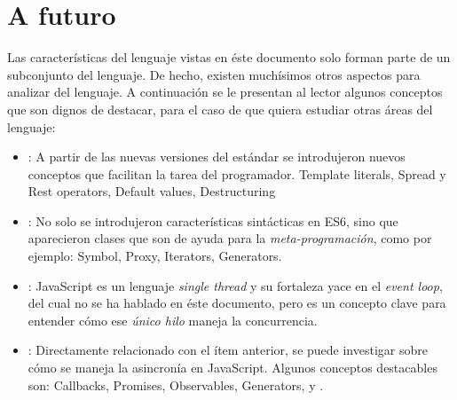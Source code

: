 \section{A futuro}

Las características del lenguaje vistas en éste documento solo forman parte de un subconjunto del lenguaje. De hecho, existen muchísimos otros aspectos para analizar del lenguaje. A continuación se le presentan al lector algunos conceptos que son dignos de destacar, para el caso de que quiera estudiar otras áreas del lenguaje:

\begin{itemize}
\item {}: A partir de las nuevas versiones del estándar se introdujeron nuevos conceptos que facilitan la tarea del programador. Template literals, Spread y Rest operators, Default values, Destructuring
\item {}: No solo se introdujeron características sintácticas en ES6, sino que aparecieron clases que son de ayuda para la \textit{meta-programación}, como por ejemplo: Symbol, Proxy, Iterators, Generators.
\item {}: JavaScript es un lenguaje \textit{single thread} y su fortaleza yace en el \textit{event loop}, del cual no se ha hablado en éste documento, pero es un concepto clave para entender cómo ese \textit{único hilo} maneja la concurrencia.
\item {}: Directamente relacionado con el ítem anterior, se puede investigar sobre cómo se maneja la asincronía en JavaScript. Algunos conceptos destacables son: Callbacks, Promises, Observables, Generators,  y .
\end{itemize}